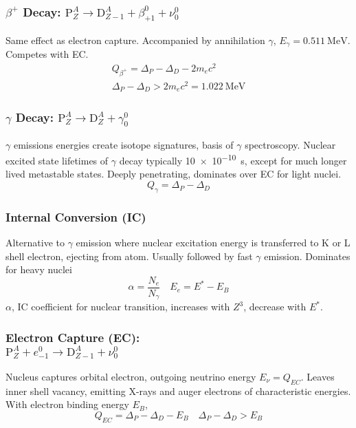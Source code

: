 \subsubsection{$\beta^+$ Decay: \textnormal{$\text{P}^A_Z \rightarrow \text{D}^A_{Z-1} + \beta^0_{+1} + \nu^0_0$}}
Same effect as electron capture. Accompanied by annihilation $\gamma$, $E_\gamma = \SI{0.511}{\mega\electronvolt}$. Competes with EC.
\begin{gather*}
Q_{\beta^+} = \Delta_P - \Delta_D - 2 m_e c^2 \\ 
\Delta_P - \Delta_D > 2 m_e c^2 = \SI{1.022}{\mega\electronvolt}
\end{gather*}

\subsubsection{$\gamma$ Decay: \textnormal{$\text{P}^A_Z \rightarrow \text{D}^{A}_{Z} + \gamma^0_0$}}

$\gamma$ emissions energies create isotope signatures, basis of $\gamma$ spectroscopy. Nuclear excited state lifetimes of $\gamma$ decay typically \SI{10e-10}{\second}, except for much longer lived metastable states. Deeply penetrating, dominates over EC for light nuclei.
\[ Q_\gamma = \Delta_P - \Delta_D \]

\subsubsection{Internal Conversion (IC)}

Alternative to $\gamma$ emission where nuclear excitation energy is transferred to K or L shell electron, ejecting from atom. Usually followed by fast $\gamma$ emission. Dominates for heavy nuclei
\[ \alpha = \frac{N_e}{N_\gamma} \quad E_e = E^* - E_B \]
$\alpha$, IC coefficient for nuclear transition, increases with $Z^3$, decrease with $E^*$.

\subsubsection{Electron Capture (EC): \\ \textnormal{$\text{P}^A_Z + e^0_{-1} \rightarrow \text{D}^{A}_{Z-1} + \nu^0_0$}}

Nucleus captures orbital electron, outgoing neutrino energy $E_\nu = Q_{EC}$. Leaves inner shell vacancy, emitting X-rays and auger electrons of characteristic energies. With electron binding energy $E_B$,
\[ Q_{EC} = \Delta_P - \Delta_D - E_B \quad \Delta_P - \Delta_D > E_B \]
